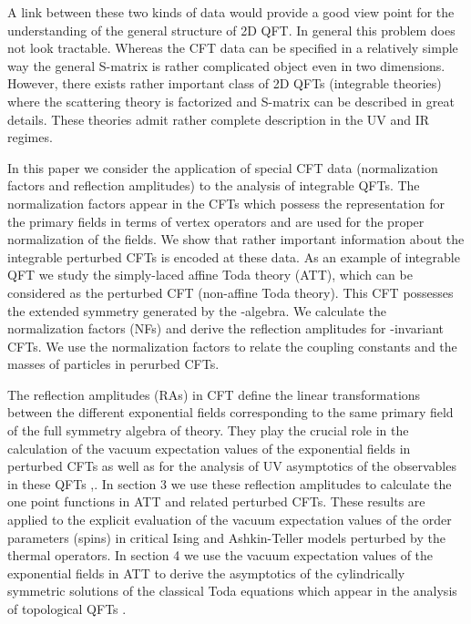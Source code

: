 \documentclass[a4paper,12pt]{article}
\begin{document}
A link between these two kinds of data would provide a good view point for
the understanding of the general structure of 2D QFT. In general this
problem does not look tractable. Whereas the CFT data can be specified in a
relatively simple way the general S-matrix is rather complicated object even
in two dimensions. However, there exists rather important class of 2D QFTs
(integrable theories) where the scattering theory is factorized and 
S-matrix can be described in great details. These theories admit rather
complete description in the UV and IR regimes.

In this paper we consider the application of special 
CFT data (normalization factors and reflection amplitudes) to the 
analysis of integrable QFTs. The normalization factors appear in the
CFTs which possess the representation for the primary fields in terms of
vertex operators and are used for the proper normalization of the fields. We
show that rather important information about the integrable perturbed CFTs
is encoded at these data. As an example of integrable QFT we study the
simply-laced affine Toda theory (ATT), which can be considered as the
perturbed CFT (non-affine Toda theory). This CFT possesses the extended
symmetry generated by the \coordHE{}-algebra. We calculate the normalization
factors (NFs) and derive the reflection amplitudes for \coordHE{}-invariant CFTs.
We use the normalization factors to relate the coupling constants and the 
masses of particles in perurbed CFTs.
 
The reflection amplitudes (RAs) in CFT define the linear transformations
between the different exponential fields corresponding to the same primary
field of the full symmetry algebra of theory. They play the crucial role in the calculation of
the vacuum expectation values of the exponential fields in perturbed CFTs 
\cite{FLZ} as well as for the analysis of UV asymptotics of the 
observables in these QFTs \cite{ZZ},\cite{AFR}. 
In section 3 we use these reflection amplitudes to
calculate the one point functions in ATT and related perturbed CFTs. These 
results are applied to the explicit evaluation of the vacuum expectation values of the order parameters (spins) in critical \coordHE{} Ising and 
Ashkin-Teller models 
perturbed by the thermal operators. In section 4 we use the vacuum 
expectation values of the exponential fields in ATT    
to derive  the asymptotics of the cylindrically symmetric solutions of the
classical Toda equations which appear in the analysis of topological QFTs 
\cite{CV}. 
\end{document}
